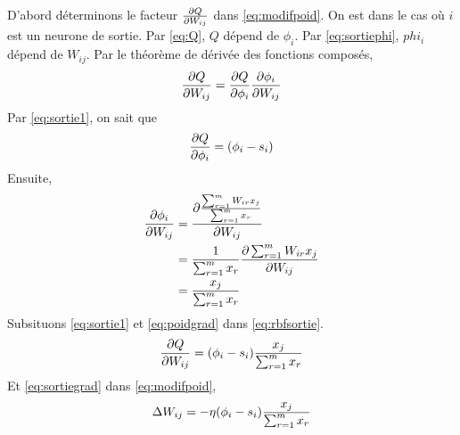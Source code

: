 D'abord déterminons le facteur $\frac{\partial Q}{\partial W_{ij}}$ dans \eqref{eq:modifpoid}. On est dans le cas où $i$ est un neurone de sortie.
Par \eqref{eq:Q}, $Q$ dépend de $\phi_i$. Par \eqref{eq:sortiephi}, $phi_i$ dépend de $W_{ij}$.
Par le théorème de dérivée des fonctions composés,
\begin{equation}\label{eq:rbfsortie}
 \frac{\partial Q}{\partial W_{ij}} = \frac{\partial Q}{\partial \phi_i} \frac{\partial \phi_i}{\partial W_{ij}}
\end{equation}
Par \eqref{eq:sortie1}, on sait que
\[\frac{\partial Q}{\partial \phi_i} = (\phi_i - s_i)\]
Ensuite,
\begin{equation}\label{eq:poidgrad}
 \begin{split}
  \frac{\partial \phi_i}{\partial W_{ij}} & = \frac{\partial \frac{\sum_{r=1}^{m}W_{ir}x_{j}}{\sum_{r=1}^{m}x_{r}}}{\partial W_{ij}}\\
  ~ & = \frac{1}{\sum_{r=1}^{m}x_{r}} \frac{\partial \sum_{r=1}^{m}W_{ir}x_{j}}{\partial W_{ij}}\\
  ~ & = \frac{x_j}{\sum_{r=1}^{m}x_{r}}
 \end{split}
\end{equation}
Subsituons \eqref{eq:sortie1} et \eqref{eq:poidgrad} dans \eqref{eq:rbfsortie}.
\begin{equation}\label{eq:sortiegrad}
 \frac{\partial Q}{\partial W_{ij}} = (\phi_i - s_i) \frac{x_j}{\sum_{r=1}^{m}x_{r}}
\end{equation}
Et \eqref{eq:sortiegrad} dans \eqref{eq:modifpoid},
\[\Delta W_{ij} = -\eta (\phi_i - s_i) \frac{x_j}{\sum_{r=1}^{m}x_{r}}\]\\

